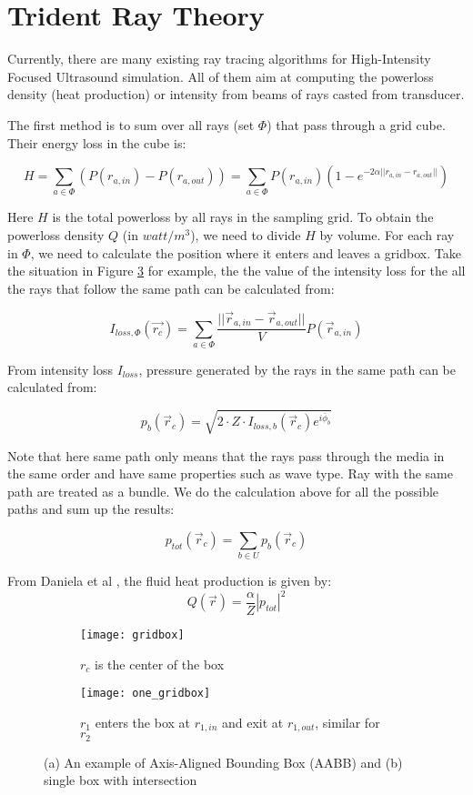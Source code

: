 
\section{Trident Ray Theory}

Currently, there are many existing ray tracing algorithms for High-Intensity Focused Ultrasound simulation. All of them aim at computing the powerloss density (heat production) or intensity from beams of rays casted from transducer. 

The first method is to sum over all rays (set $\Phi$) that pass through a grid cube. Their energy loss in the cube is:

\begin{equation} \label{eq:first_rc}
    H = \sum_{a \in \Phi} (P(r_{a,in}) - P(r_{a,out})) = \sum_{a \in \Phi} P(r_{a,in})(1-e^{-2\alpha ||r_{a,in} - r_{a,out}||})
\end{equation}

Here $H$ is the total powerloss by all rays in the sampling grid. To obtain the powerloss density $Q$ (in $watt/m^3$), we need to divide $H$ by volume. For each ray in $\Phi$, we need to calculate the position where it enters and leaves a gridbox. Take the situation in Figure \ref{fig:one_gridbox} for example, the the value of the intensity loss for the all the rays that follow the same path can be calculated from: 

$$I_{loss,\Phi}(\vec{r_c})=\sum_{a \in \Phi} \frac{||\vec{r}_{a,in}-\vec{r}_{a,out}||}{V} P(\vec{r}_{a,in})$$
\label{eq:calc_I_Loss}

From intensity loss $I_{loss}$, pressure generated by the rays in the same path can be calculated from:

$$p_b(\vec{r}_c)=\sqrt{2\cdot Z\cdot I_{loss,b}(\vec{r}_c)e^{i\bar{\phi}_b}}$$

Note that here same path only means that the rays pass through the media in the same order and have same properties such as wave type. Ray with the same path are treated as a bundle. We do the calculation above for all the possible paths and sum up the results:

$$p_{tot}(\vec{r}_c)=\sum_{b \in U}p_b(\vec{r}_c)$$

From Daniela et al \cite{Modena_2018}, the fluid heat production is given by:
$$Q(\vec{r})=\frac{\alpha}{Z}|p_{tot}|^2$$
\label{eq:fluid_hp}

\begin{figure}
    \centering
    \begin{subfigure}[b]{0.45\textwidth}
        \texttt{[image: gridbox]}
        \caption{$r_c$ is the center of the box}
        \label{fig:gridbox}
    \end{subfigure}
    \begin{subfigure}[b]{0.5\textwidth}
        \texttt{[image: one\_gridbox]}
        \caption{$r_1$ enters the box at $r_{1,in}$ and exit at $r_{1,out}$, similar for $r_2$}
        \label{fig:one_gridbox}
    \end{subfigure}
    \caption{(a) An example of Axis-Aligned Bounding Box (AABB) and (b) single box with intersection}
\end{figure}

